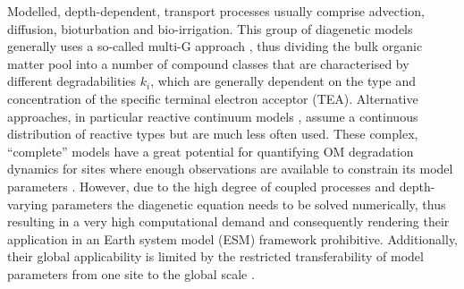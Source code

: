 \documentclass[gmd, manuscript]{copernicus}
\begin{document}
Modelled, depth-dependent, transport processes usually comprise advection, diffusion, bioturbation and bio-irrigation.   
This group of diagenetic models generally uses a so-called multi-G approach \citep{joergensen_comparison_1978_2, berner_early_1980}, thus dividing the bulk organic 
matter pool into a number of compound classes that are characterised by different degradabilities $k_i$, which are generally dependent on the type and concentration 
of the specific terminal electron acceptor (TEA). 
Alternative approaches, in particular reactive continuum models \citep{boudreau_reactive_1991}, assume a continuous distribution of reactive types but are much less often used. 
These complex, ``complete'' models have a great potential for quantifying OM degradation dynamics for sites where enough observations are available to constrain its model 
parameters \citep[see e.g.][for applications]{boudreau_comparative_1998, wang_multicomponent_1996, thullner_global_scale_2009}. 
However, due to the high degree of coupled processes and depth-varying parameters the diagenetic equation needs to be %
solved numerically, thus resulting in a very high computational demand and consequently rendering their application in an Earth system model (ESM) framework prohibitive. 
Additionally, their global applicability is limited by the restricted transferability of model parameters from one site to the global scale \citep{arndt_quantifying_2013}. 
\end{document}
